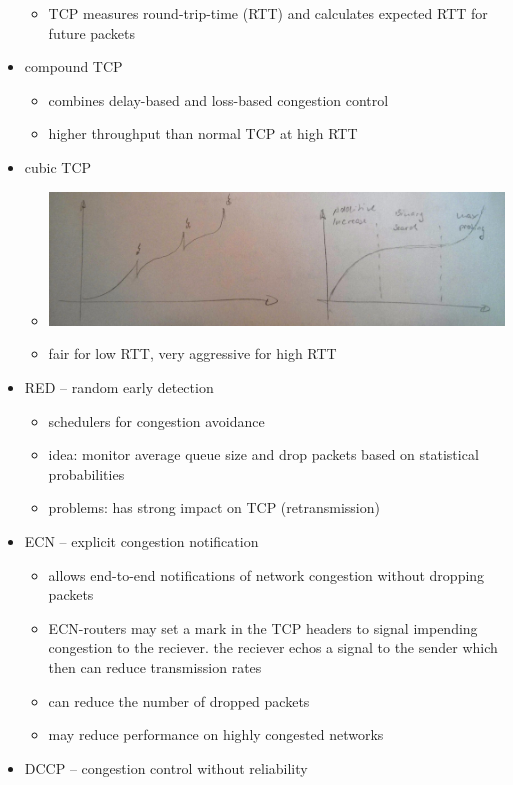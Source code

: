 \documentclass[a4paper,10pt]{scrreprt}
\begin{document}
\begin{itemize}
\begin{itemize}
  \item TCP measures round-trip-time (RTT) and calculates expected RTT for future packets
 \end{itemize}
 \item compound TCP
 \begin{itemize}
  \item combines delay-based and loss-based congestion control
  \item higher throughput than normal TCP at high RTT
 \end{itemize}
 \item cubic TCP
 \begin{itemize}
  \item \includegraphics[width=.8\linewidth]{cubictcp.jpg}
  \item fair for low RTT, very aggressive for high RTT
 \end{itemize}
 \item RED -- random early detection
 \begin{itemize}
  \item schedulers for congestion avoidance
  \item idea: monitor average queue size and drop packets based on statistical probabilities
  \item problems: has strong impact on TCP (retransmission)
 \end{itemize}
 \item ECN -- explicit congestion notification
 \begin{itemize}
  \item allows end-to-end notifications of network congestion without dropping packets
  \item ECN-routers may set a mark in the TCP headers to signal impending congestion to the reciever. the reciever echos a signal to the sender which then can reduce transmission rates
  \item can reduce the number of dropped packets
  \item may reduce performance on highly congested networks
 \end{itemize}
 \item DCCP -- congestion control without reliability

\end{itemize}
\end{document}
